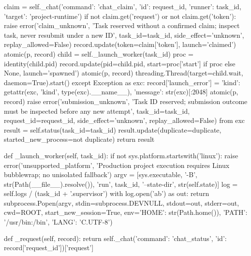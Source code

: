                     claim = self._chat({'command': 'chat_claim', 'id': request_id,
                                        'runner': task_id, 'target': 'project-runtime'})
                    if not claim.get('request') or not claim.get('token'):
                        raise error('claim_unknown', 'Task reserved without a confirmed claim; inspect task, never resubmit under a new ID',
                                    task_id=task_id, side_effect='unknown', replay_allowed=False)
                    record.update(token=claim['token'], launch='claimed')
                    atomic(p, record)
                    child = self._launch_worker(task_id)
                    proc = identity(child.pid)
                    record.update(pid=child.pid, start=proc['start'] if proc else None, launch='spawned')
                    atomic(p, record)
                    threading.Thread(target=child.wait, daemon=True).start()
                except Exception as exc:
                    record['launch_error'] = {'kind': getattr(exc, 'kind', type(exc).__name__), 'message': str(exc)[:2048]}
                    atomic(p, record)
                    raise error('submission_unknown', 'Task ID reserved; submission outcome must be inspected before any new attempt',
                                task_id=task_id, request_id=request_id, side_effect='unknown', replay_allowed=False) from exc
        result = self.status(task_id=task_id)
        result.update(duplicate=duplicate, started_new_process=not duplicate)
        return result

    def _launch_worker(self, task_id):
        if not sys.platform.startswith('linux'):
            raise error('unsupported_platform', 'Production project execution requires Linux bubblewrap; no unisolated fallback')
        argv = [sys.executable, '-B', str(Path(__file__).resolve()), 'run', task_id, '--state-dir', str(self.state)]
        log = self.logs / (task_id + '.supervisor')
        with log.open('ab') as out:
            return subprocess.Popen(argv, stdin=subprocess.DEVNULL, stdout=out, stderr=out,
                                    cwd=ROOT, start_new_session=True,
                                    env={'HOME': str(Path.home()), 'PATH': '/usr/bin:/bin', 'LANG': 'C.UTF-8'})

    def _request(self, record):
        return self._chat({'command': 'chat_status', 'id': record['request_id']})['request']

